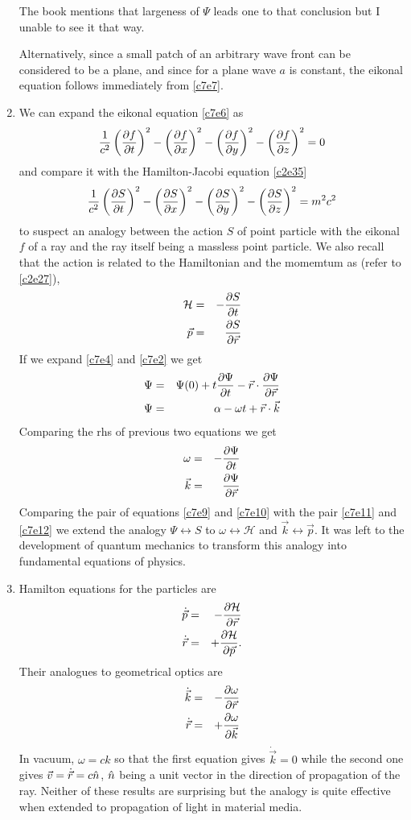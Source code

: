\begin{enumerate}
The book mentions that largeness of $\Psi$ leads one to that conclusion but I 
unable to see it that way.

Alternatively, since a small patch of an arbitrary wave front can be considered
to be a plane, and since for a plane wave $a$ is constant, the eikonal equation
follows immediately from \eqref{c7e7}.

\item We can expand the eikonal equation \eqref{c7e6} as
\[
\frac{1}{c^2}\left(\frac{\partial{f}}{\partial{t}}\right)^2 - \left(\frac{\partial{f}}{\partial{x}}\right)^2 - 
\left(\frac{\partial{f}}{\partial{y}}\right)^2 - \left(\frac{\partial{f}}{\partial{z}}\right)^2 = 0
\]
and compare it with the Hamilton-Jacobi equation \eqref{c2e35}
\[
\frac{1}{c^2}\left(\frac{\partial{S}}{\partial{t}}\right)^2 - \left(\frac{\partial{S}}{\partial{x}}\right)^2 
- \left(\frac{\partial{S}}{\partial{y}}\right)^2 - \left(\frac{\partial{S}}{\partial{z}}\right)^2 = m^2c^2
\]
to suspect an analogy between the action $S$ of point particle with the eikonal
$f$ of a ray and the ray itself being a massless point particle. We also recall
that the action is related to the Hamiltonian and the momemtum as (refer to
\eqref{c2e27}),
\begin{eqnarray}
\mathcal{H} &=& -\frac{\partial{S}}{\partial{t}} \label{c7e9} \\
\vec{p} &=& \frac{\partial{S}}{\partial{\vec{r}}} \label{c7e10}
\end{eqnarray}
If we expand \eqref{c7e4} and \eqref{c7e2} we get
\begin{eqnarray*}
\Psi &=& \Psi(0) + t\frac{\partial{\Psi}}{\partial{t}} - \vec{r}\cdot\frac{\partial{\Psi}}{\partial{\vec{r}}} \\
\Psi &=& \alpha - \omega t + \vec{r}\cdot\vec{k}
\end{eqnarray*}
Comparing the rhs of previous two equations we get
\begin{eqnarray}
\omega &=& -\frac{\partial{\Psi}}{\partial{t}} \label{c7e11} \\
\vec{k} &=& \frac{\partial{\Psi}}{\partial{\vec{r}}} \label{c7e12}
\end{eqnarray}
Comparing the pair of equations \eqref{c7e9} and \eqref{c7e10} with the pair
\eqref{c7e11} and \eqref{c7e12} we extend the analogy $\Psi \leftrightarrow S$
to $\omega \leftrightarrow \mathcal{H}$ and $\vec{k} \leftrightarrow \vec{p}$.
It was left to the development of quantum mechanics to transform this analogy
into fundamental equations of physics.

\item Hamilton equations for the particles are
\begin{eqnarray*}
\dot{\vec{p}} &=& -\frac{\partial{\mathcal{H}}}{\partial{\vec{r}}} \\
\dot{\vec{r}} &=& +\frac{\partial{\mathcal{H}}}{\partial{\vec{p}}}.
\end{eqnarray*}
Their analogues to geometrical optics are
\begin{eqnarray}
\dot{\vec{k}} &=& -\frac{\partial{\omega}}{\partial{\vec{r}}} \label{c7e13} \\
\dot{\vec{r}} &=& +\frac{\partial{\omega}}{\partial{\vec{k}}} \label{c7e14}
\end{eqnarray}
In vacuum, $\omega = ck$ so that the first equation gives $\dot{\vec{k}} = 0$ 
while the second one gives $\vec{v} = \dot{\vec{r}} = c\hat{n}$, $\hat{n}$ being a unit
vector in the direction of propagation of the ray. Neither of these results are 
surprising but the analogy is quite effective when extended to propagation of 
light in material media.


\end{enumerate}
